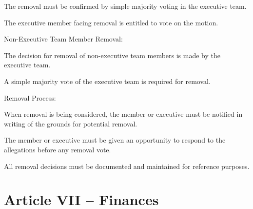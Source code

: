 \documentclass[12pt,a4paper]{article}
\begin{document}
\begin{constitutionlist}
\begin{constitutionlist}
\begin{constitutionlist}
\item The removal must be confirmed by simple majority voting in the executive team.

\item The executive member facing removal is entitled to vote on the motion.
\end{constitutionlist}
\end{constitutionlist}

\item Non-Executive Team Member Removal:

\begin{constitutionlist}
\item The decision for removal of non-executive team members is made by the executive team.

\item A simple majority vote of the executive team is required for removal.
\end{constitutionlist}

\item Removal Process:

\begin{constitutionlist}
\item When removal is being considered, the member or executive must be notified in writing of the grounds for potential removal.

\item The member or executive must be given an opportunity to respond to the allegations before any removal vote.

\item All removal decisions must be documented and maintained for reference purposes.
\end{constitutionlist}
\end{constitutionlist}

\section{Article VII – Finances}
\end{document}
